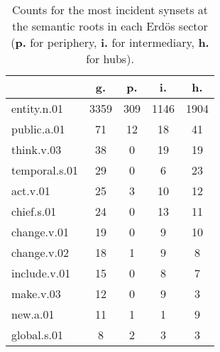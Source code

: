 \begin{table}[h!]
\begin{center}
\begin{tabular}{| l || c | c | c | c |}\hline
 & {\bf g.} & {\bf p.} & {\bf i.} & {\bf h.} \\\hline\hline
entity.n.01 & 3359  & 309  & 1146  & 1904 \\\hline
public.a.01 & 71  & 12  & 18  & 41 \\\hline
think.v.03 & 38  & 0  & 19  & 19 \\\hline
temporal.s.01 & 29  & 0  & 6  & 23 \\\hline
act.v.01 & 25  & 3  & 10  & 12 \\\hline
chief.s.01 & 24  & 0  & 13  & 11 \\\hline
change.v.01 & 19  & 0  & 9  & 10 \\\hline
change.v.02 & 18  & 1  & 9  & 8 \\\hline
include.v.01 & 15  & 0  & 8  & 7 \\\hline
make.v.03 & 12  & 0  & 9  & 3 \\\hline
new.a.01 & 11  & 1  & 1  & 9 \\\hline
global.s.01 & 8  & 2  & 3  & 3 \\\hline
\end{tabular}
\caption{Counts for the most incident synsets at the semantic roots in each Erd\"os sector ({{\bf p.}} for periphery, {{\bf i.}} for intermediary, {{\bf h.}} for hubs).}
\end{center}
\end{table}